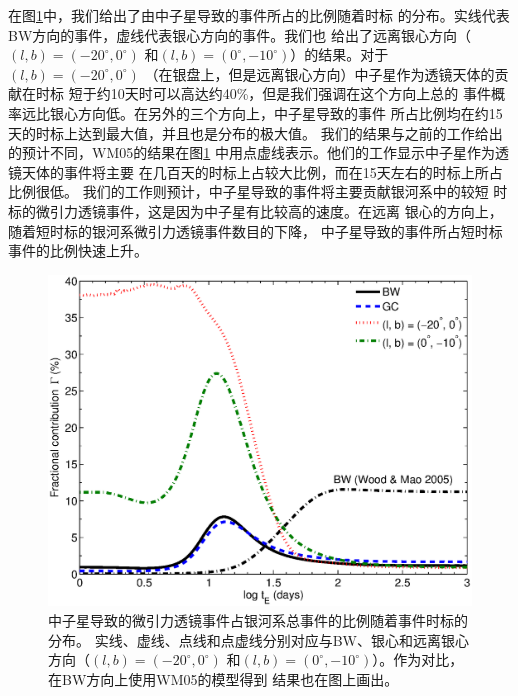 在图\ref{ratio}中，我们给出了由中子星导致的事件所占的比例随着时标
的分布。实线代表BW方向的事件，虚线代表银心方向的事件。我们也
给出了远离银心方向（$(l,b)=(-20^{\circ},0^{\circ})$ 
和$(l,b)=(0^{\circ},-10^{\circ})$）的结果。对于$(l,b)=(-20^{\circ},0^{\circ})$
（在银盘上，但是远离银心方向）中子星作为透镜天体的贡献在时标
短于约10天时可以高达约40\%，但是我们强调在这个方向上总的
事件概率远比银心方向低。在另外的三个方向上，中子星导致的事件
所占比例均在约15天的时标上达到最大值，并且也是分布的极大值。
我们的结果与之前的工作给出的预计不同，WM05的结果在图\ref{ratio}
中用点虚线表示。他们的工作显示中子星作为透镜天体的事件将主要
在几百天的时标上占较大比例，而在15天左右的时标上所占比例很低。
我们的工作则预计，中子星导致的事件将主要贡献银河系中的较短
时标的微引力透镜事件，这是因为中子星有比较高的速度。在远离
银心的方向上，随着短时标的银河系微引力透镜事件数目的下降，
中子星导致的事件所占短时标事件的比例快速上升。

%
\begin{figure}
\begin{center}
  \includegraphics[width=4 in,trim=0 0 0 3cm]{ratio.eps}
%
\caption{中子星导致的微引力透镜事件占银河系总事件的比例随着事件时标的分布。
实线、虚线、点线和点虚线分别对应与BW、银心和远离银心方向（$(l,b)=(-20^{\circ},0^{\circ})$
和$(l,b)=(0^{\circ},-10^{\circ})$）。作为对比，在BW方向上使用WM05的模型得到
结果也在图上画出。}
\label{ratio}
\end{center}
\end{figure}
%

